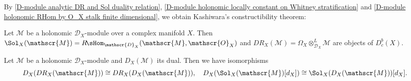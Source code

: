 By \cref{D-module analytic DR and Sol duality relation}, \cref{D-module holonomic locally constant on Whitney stratification} and \cref{D-module holonomic RHom by O_X stalk finite dimensional}, we obtain Kashiwara's constructibility theorem:

\begin{theorem}\label{D-module holonomic constructiblity}
Let $\mathscr{M}$ be a holonomic $\mathscr{D}_X$-module over a complex manifold $X$. Then $\Sol_X(\mathscr{M})=R\!\sHom_{\mathscr{D}_X}(\mathscr{M},\mathscr{O}_X)$ and $DR_X(\mathscr{M})=\Omega_X\otimes_{\mathscr{D}_X}^L\mathscr{M}$ are objects of $D^b_c(X)$.
\end{theorem}

\begin{corollary}\label{D-module holonomic dual of DR_X and Sol_X char}
Let $\mathscr{M}$ be a holonomic $\mathscr{D}_X$-module and $D_X(\mathscr{M})$ its dual. Then we have isomorphisms
\[D_X(DR_X(\mathscr{M}))\cong DR_X(D_X(\mathscr{M})),\quad D_X(\Sol_X(\mathscr{M})[d_X])\cong \Sol_X(D_X(\mathscr{M}))[d_X].\]
\end{corollary}

